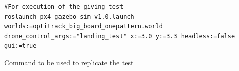 \documentclass[../Head/report.tex]{subfiles}
\begin{document}
\begin{listing}[H] 
\begin{tcolorbox}[
    enhanced,
    attach boxed title to top left={xshift=6mm,yshift=-3mm},
    colback=lightgreen!20,
    colframe=lightgreen,
    fonttitle=\bfseries\color{black},
]
\begin{verbatim}
#For execution of the giving test
roslaunch px4 gazebo_sim_v1.0.launch worlds:=optitrack_big_board_onepattern.world drone_control_args:="landing_test" x:=3.0 y:=3.3 headless:=false gui:=true
\end{verbatim}
\end{tcolorbox}
\caption{Command to be used to replicate the test}
\label{lst:landing_test}    
\end{listing} 
\end{document}
